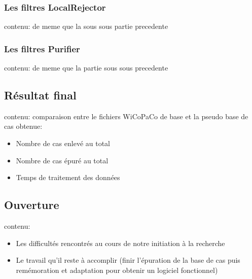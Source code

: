 \documentclass{article}
\begin{document}
\subsubsection{Les filtres LocalRejector}
contenu:
de meme que la sous sous partie precedente

\subsubsection{Les filtres Purifier}
contenu:
de meme que la partie sous sous precedente

\subsection{R\'{e}sultat final}
contenu:
comparaison entre le fichiers WiCoPaCo de base et la pseudo base de cas obtenue:
\begin{itemize}
\item Nombre de cas enlev\'{e} au total
\item Nombre de cas \'{e}pur\'{e} au total
\item Temps de traitement des donn\'{e}es
\end{itemize}

\subsection{Ouverture}
contenu:
\begin{itemize}
\item Les difficult\'{e}s rencontr\'{e}s au cours de notre initiation \`{a} la recherche
\item Le travail qu'il reste \`{a} accomplir (finir l'\'{e}puration de la base de cas puis rem\'{e}moration et adaptation pour obtenir un logiciel fonctionnel)
\end{itemize}
\end{document}
